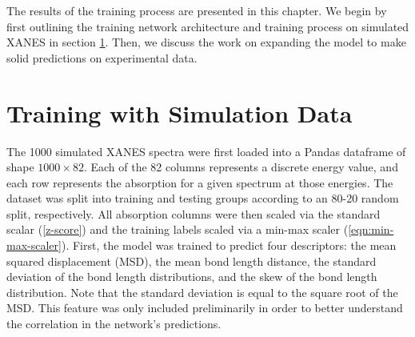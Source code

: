 The results of the training process are presented in this chapter. We begin by first outlining the training network architecture and training process on simulated XANES in section \ref{sec:nn-sim-data}. Then, we discuss the work on expanding the model to make solid predictions on experimental data.

\section{Training with Simulation Data} \label{sec:nn-sim-data}

The 1000 simulated XANES spectra were first loaded into a Pandas dataframe \cite{pandas-1} \cite{pandas-2} of shape $ 1000\times82 $. Each of the 82 columns represents a discrete energy value, and each row represents the absorption for a given spectrum at those energies. The dataset was split into training and testing groups according to an 80-20 random split, respectively. All absorption columns were then scaled via the standard scalar (\ref{z-score}) and the training labels scaled via a min-max scaler (\ref{eqn:min-max-scaler}). First, the model was trained to predict four descriptors: the mean squared displacement (MSD), the mean bond length distance, the standard deviation of the bond length distributions, and the skew of the bond length distribution. Note that the standard deviation is equal to the square root of the MSD. This feature was only included preliminarily in order to better understand the correlation in the network's predictions. 

